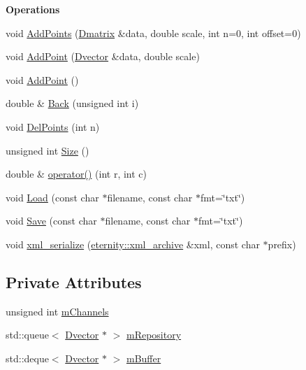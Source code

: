 \begin{Indent}\textbf{ Operations}\par
\begin{DoxyCompactItemize}
\item 
void \hyperlink{classtsa_1_1_fifo_buffer_ab70c4b3ba1a5356ab5384cd7f8638b0d}{Add\+Points} (\hyperlink{namespacetsa_ad260cd21c1891c4ed391fe788569aba4}{Dmatrix} \&data, double scale, int n=0, int offset=0)
\item 
void \hyperlink{classtsa_1_1_fifo_buffer_a7058127e3d126d9d6f434d3bf386c59b}{Add\+Point} (\hyperlink{namespacetsa_a8900fb03d849baf447a1a0efe2561fb2}{Dvector} \&data, double scale)
\item 
void \hyperlink{classtsa_1_1_fifo_buffer_a5cec8568b62047b4fb5b19c3fb44d28b}{Add\+Point} ()
\item 
double \& \hyperlink{classtsa_1_1_fifo_buffer_a4a799676b78f5bc80d48db4fe7d64853}{Back} (unsigned int i)
\item 
void \hyperlink{classtsa_1_1_fifo_buffer_a17acb27e83ab4af3667974660b58cb4e}{Del\+Points} (int n)
\item 
unsigned int \hyperlink{classtsa_1_1_fifo_buffer_a7c14d2ae86c581d1ccc427dccb3f1213}{Size} ()
\item 
double \& \hyperlink{classtsa_1_1_fifo_buffer_a78f313804a23e61fa57329b6a1f3df02}{operator()} (int r, int c)
\item 
void \hyperlink{classtsa_1_1_fifo_buffer_a597548e1842c157dfe1ade0f9e5cd121}{Load} (const char $\ast$filename, const char $\ast$fmt=\char`\"{}txt\char`\"{})
\item 
void \hyperlink{classtsa_1_1_fifo_buffer_aeb760c1c71644dc850395b838e47bcfb}{Save} (const char $\ast$filename, const char $\ast$fmt=\char`\"{}txt\char`\"{})
\item 
void \hyperlink{classtsa_1_1_fifo_buffer_a8ad8bf7c3935bf645b6cda8be7de441a}{xml\+\_\+serialize} (\hyperlink{classeternity_1_1xml__archive}{eternity\+::xml\+\_\+archive} \&xml, const char $\ast$prefix)
\end{DoxyCompactItemize}
\end{Indent}
\subsection*{Private Attributes}
\begin{DoxyCompactItemize}
\item 
unsigned int \hyperlink{classtsa_1_1_fifo_buffer_add6db36d6910a8b1efba4b2439f4b9c5}{m\+Channels}
\item 
std\+::queue$<$ \hyperlink{namespacetsa_a8900fb03d849baf447a1a0efe2561fb2}{Dvector} $\ast$ $>$ \hyperlink{classtsa_1_1_fifo_buffer_a538034e48a1c598fbbde1fefb9e92f91}{m\+Repository}
\item 
std\+::deque$<$ \hyperlink{namespacetsa_a8900fb03d849baf447a1a0efe2561fb2}{Dvector} $\ast$ $>$ \hyperlink{classtsa_1_1_fifo_buffer_aa8039b60b66e4e6bedd661352fff095f}{m\+Buffer}
\end{DoxyCompactItemize}


